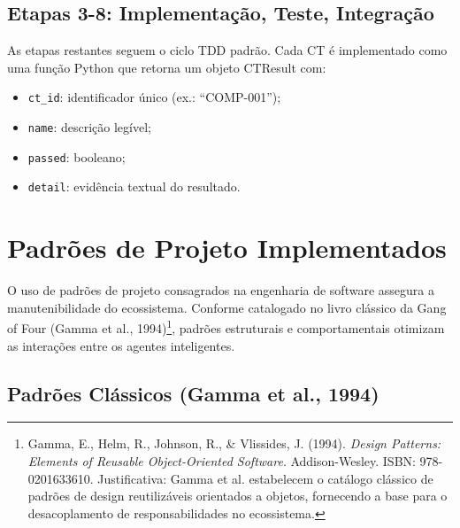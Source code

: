 \documentclass[12pt,a4paper,oneside]{abntex2}
\begin{document}
\begin{apendicesenv}
\subsection{Etapas 3-8: Implementação, Teste, Integração}

As etapas restantes seguem o ciclo TDD padrão. Cada CT é implementado como uma função Python que retorna um objeto CTResult com:
\begin{itemize}
    \item \texttt{ct\_id}: identificador único (ex.: ``COMP-001'');
    \item \texttt{name}: descrição legível;
    \item \texttt{passed}: booleano;
    \item \texttt{detail}: evidência textual do resultado.
\end{itemize}

\section{Padrões de Projeto Implementados}

O uso de padrões de projeto consagrados na engenharia de software assegura a manutenibilidade do ecossistema. Conforme catalogado no livro clássico da Gang of Four (Gamma et al., 1994)\footnote{Gamma, E., Helm, R., Johnson, R., \& Vlissides, J. (1994). \textit{Design Patterns: Elements of Reusable Object-Oriented Software}. Addison-Wesley. ISBN: 978-0201633610. Justificativa: Gamma et al. estabelecem o catálogo clássico de padrões de design reutilizáveis orientados a objetos, fornecendo a base para o desacoplamento de responsabilidades no ecossistema.}, padrões estruturais e comportamentais otimizam as interações entre os agentes inteligentes.

\subsection{Padrões Clássicos (Gamma et al., 1994)}


\end{apendicesenv}
\end{document}
